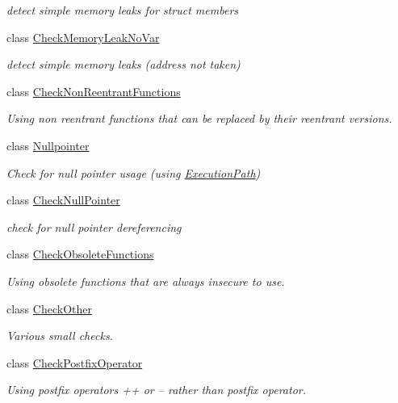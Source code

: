 \begin{DoxyCompactItemize}
\begin{DoxyCompactList}\small\item\em detect simple memory leaks for struct members \end{DoxyCompactList}\item 
class \hyperlink{class_check_memory_leak_no_var}{Check\-Memory\-Leak\-No\-Var}
\begin{DoxyCompactList}\small\item\em detect simple memory leaks (address not taken) \end{DoxyCompactList}\item 
class \hyperlink{class_check_non_reentrant_functions}{Check\-Non\-Reentrant\-Functions}
\begin{DoxyCompactList}\small\item\em Using non reentrant functions that can be replaced by their reentrant versions. \end{DoxyCompactList}\item 
class \hyperlink{class_nullpointer}{Nullpointer}
\begin{DoxyCompactList}\small\item\em Check for null pointer usage (using \hyperlink{class_execution_path}{Execution\-Path}) \end{DoxyCompactList}\item 
class \hyperlink{class_check_null_pointer}{Check\-Null\-Pointer}
\begin{DoxyCompactList}\small\item\em check for null pointer dereferencing \end{DoxyCompactList}\item 
class \hyperlink{class_check_obsolete_functions}{Check\-Obsolete\-Functions}
\begin{DoxyCompactList}\small\item\em Using obsolete functions that are always insecure to use. \end{DoxyCompactList}\item 
class \hyperlink{class_check_other}{Check\-Other}
\begin{DoxyCompactList}\small\item\em Various small checks. \end{DoxyCompactList}\item 
class \hyperlink{class_check_postfix_operator}{Check\-Postfix\-Operator}
\begin{DoxyCompactList}\small\item\em Using postfix operators ++ or -- rather than postfix operator. \end{DoxyCompactList}\item 

\end{DoxyCompactItemize}
